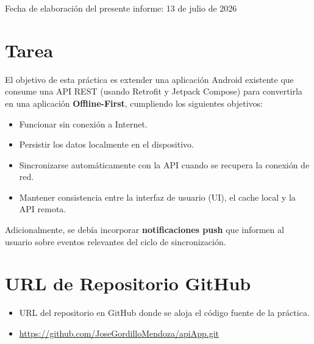 \documentclass{article}
\newcommand{\itemReportDate}{13 de julio de 2026}
\newcommand{\itemRepoUrl}{https://github.com/JoseGordilloMendoza/apiApp.git}
\begin{document}
	\begin{center}
		\small Fecha de elaboración del presente informe: \itemReportDate
	\end{center}

	\section{Tarea}
	El objetivo de esta práctica es extender una aplicación Android existente que consume una API REST (usando Retrofit y Jetpack Compose) para convertirla en una aplicación \textbf{Offline-First}, cumpliendo los siguientes objetivos:
	\begin{itemize}
		\item[a.] Funcionar sin conexión a Internet.
		\item[b.] Persistir los datos localmente en el dispositivo.
		\item[c.] Sincronizarse automáticamente con la API cuando se recupera la conexión de red.
		\item[d.] Mantener consistencia entre la interfaz de usuario (UI), el cache local y la API remota.
	\end{itemize}
	Adicionalmente, se debía incorporar \textbf{notificaciones push} que informen al usuario sobre eventos relevantes del ciclo de sincronización.

	\section{URL de Repositorio GitHub}
	\begin{itemize}
		\item URL del repositorio en GitHub donde se aloja el código fuente de la práctica.
		\item \url{\itemRepoUrl}
	\end{itemize}
\end{document}
